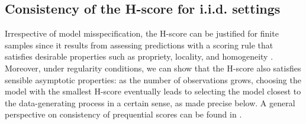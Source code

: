 \documentclass[12pt]{article}
\theoremstyle{plain}
\theoremstyle{definition}
\begin{document}
	
	\subsection{Consistency of the H-score for i.i.d.\! settings}
	\label{sec:consistencyIID}
	
	Irrespective of model misspecification, the H-score can be justified for finite samples 
	since it results from assessing predictions with a scoring rule that satisfies desirable properties such as propriety, locality, and homogeneity \citep{parry2012,ehm2012}.
	Moreover, under regularity conditions, we can show that the H-score also satisfies sensible asymptotic properties: as the number of observations grows, choosing
	the model with the smallest H-score eventually leads to selecting the model
	closest to the data-generating process in a certain sense, as made precise below. 
	A general perspective on consistency of prequential scores can be found in \citet{dawid2015}.
	
\end{document}
